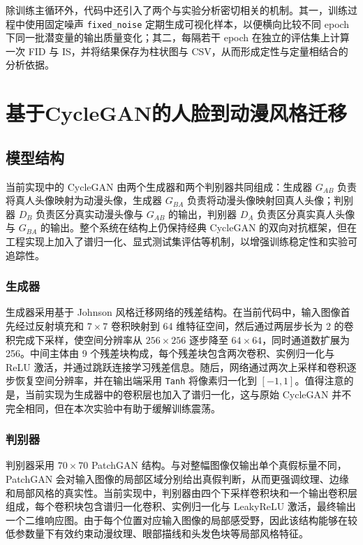 \documentclass[12pt, a4paper, UTF8]{ctexart}
\begin{document}
除训练主循环外，代码中还引入了两个与实验分析密切相关的机制。其一，训练过程中使用固定噪声 \verb|fixed_noise| 定期生成可视化样本，以便横向比较不同 epoch 下同一批潜变量的输出质量变化；其二，每隔若干 epoch 在独立的评估集上计算一次 FID 与 IS，并将结果保存为柱状图与 CSV，从而形成定性与定量相结合的分析依据。

\section{基于CycleGAN的人脸到动漫风格迁移}
\subsection{模型结构}
\noindent 当前实现中的 CycleGAN 由两个生成器和两个判别器共同组成：生成器 $G_{AB}$ 负责将真人头像映射为动漫头像，生成器 $G_{BA}$ 负责将动漫头像映射回真人头像；判别器 $D_B$ 负责区分真实动漫头像与 $G_{AB}$ 的输出，判别器 $D_A$ 负责区分真实真人头像与 $G_{BA}$ 的输出。整个系统在结构上仍保持经典 CycleGAN 的双向对抗框架，但在工程实现上加入了谱归一化、显式测试集评估等机制，以增强训练稳定性和实验可追踪性。

\subsubsection{生成器}
\noindent 生成器采用基于 Johnson 风格迁移网络的残差结构\cite{johnson2016perceptual}。在当前代码中，输入图像首先经过反射填充和 $7\times7$ 卷积映射到 64 维特征空间，然后通过两层步长为 2 的卷积完成下采样，使空间分辨率从 $256\times256$ 逐步降至 $64\times64$，同时通道数扩展为 256。中间主体由 9 个残差块构成，每个残差块包含两次卷积、实例归一化与 ReLU 激活，并通过跳跃连接学习残差信息。随后，网络通过两次上采样和卷积逐步恢复空间分辨率，并在输出端采用 \verb|Tanh| 将像素归一化到 $[-1,1]$。值得注意的是，当前实现为生成器中的卷积层也加入了谱归一化，这与原始 CycleGAN 并不完全相同，但在本次实验中有助于缓解训练震荡。

\subsubsection{判别器}
\noindent 判别器采用 $70\times70$ PatchGAN 结构。与对整幅图像仅输出单个真假标量不同，PatchGAN 会对输入图像的局部区域分别给出真假判断，从而更强调纹理、边缘和局部风格的真实性。当前实现中，判别器由四个下采样卷积块和一个输出卷积层组成，每个卷积块包含谱归一化卷积、实例归一化与 LeakyReLU 激活，最终输出一个二维响应图。由于每个位置对应输入图像的局部感受野，因此该结构能够在较低参数量下有效约束动漫纹理、眼部描线和头发色块等局部风格特征。
\end{document}
